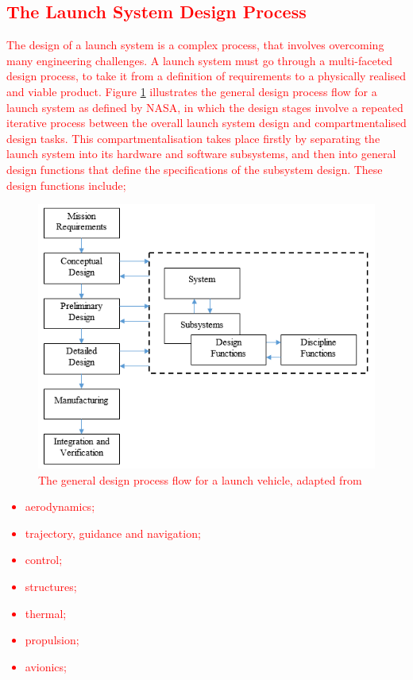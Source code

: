    
   
   
  
  \textcolor{red}{
  \section{The Launch System Design Process}
}
 \textcolor{red}{
The design of a launch system is a complex process, that involves overcoming many engineering challenges. A launch system must go through a multi-faceted design process, to take it from a definition of requirements to a physically realised and viable product. Figure \ref{fig:DesignFlow} illustrates the general design process flow for a launch system as defined by NASA\cite{Blair2001}, in which the design stages involve a repeated iterative process between the overall launch system design and compartmentalised design tasks. This compartmentalisation takes place firstly by separating the
launch system into its hardware and software subsystems, and then into general design functions that define the specifications of the subsystem design. These design functions include;
\begin{figure}[ht]
	\centering
	\includegraphics[width=0.7\linewidth]{figures/2_literature-review/DesignFlow}
	\caption{The general design process flow for a launch vehicle, adapted from \cite{Blair2001}}
	\label{fig:DesignFlow}
\end{figure}
\begin{itemize}
	\setlength\itemsep{.2em}
\item aerodynamics;
\item trajectory, guidance and navigation;
\item control;
\item structures;
\item thermal;
\item propulsion;
\item avionics;

\end{itemize}}
